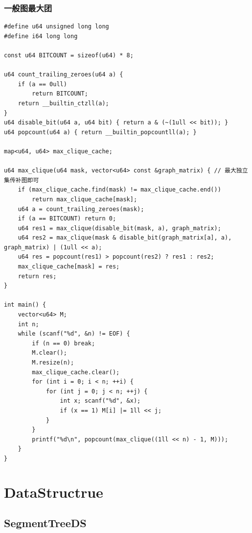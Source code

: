 \documentclass[twoside]{article}
\begin{document}
\subsubsection{一般图最大团}
\begin{lstlisting}
#define u64 unsigned long long
#define i64 long long

const u64 BITCOUNT = sizeof(u64) * 8;

u64 count_trailing_zeroes(u64 a) {
    if (a == 0ull)
        return BITCOUNT;
    return __builtin_ctzll(a);
}
u64 disable_bit(u64 a, u64 bit) { return a & (~(1ull << bit)); }
u64 popcount(u64 a) { return __builtin_popcountll(a); }

map<u64, u64> max_clique_cache;

u64 max_clique(u64 mask, vector<u64> const &graph_matrix) { // 最大独立集传补图即可
    if (max_clique_cache.find(mask) != max_clique_cache.end())
        return max_clique_cache[mask];
    u64 a = count_trailing_zeroes(mask);
    if (a == BITCOUNT) return 0;
    u64 res1 = max_clique(disable_bit(mask, a), graph_matrix);
    u64 res2 = max_clique(mask & disable_bit(graph_matrix[a], a), graph_matrix) | (1ull << a);
    u64 res = popcount(res1) > popcount(res2) ? res1 : res2;
    max_clique_cache[mask] = res;
    return res;
}

int main() {
    vector<u64> M;
    int n;
    while (scanf("%d", &n) != EOF) {
        if (n == 0) break;
        M.clear();
        M.resize(n);
        max_clique_cache.clear();
        for (int i = 0; i < n; ++i) {
            for (int j = 0; j < n; ++j) {
                int x; scanf("%d", &x);
                if (x == 1) M[i] |= 1ll << j;
            }
        }
        printf("%d\n", popcount(max_clique((1ll << n) - 1, M)));
    }
}\end{lstlisting}
\clearpage\section{DataStructrue}
\subsection{SegmentTreeDS}
\end{document}
